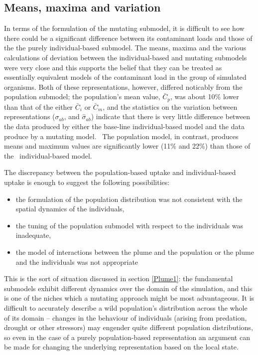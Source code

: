 \documentclass{article}
\newenvironment{itemizedot}{\begin{itemize} \renewcommand{\labelitemi}{$\bullet$}\renewcommand{\labelitemii}{$\bullet$}\renewcommand{\labelitemiii}{$\bullet$}\renewcommand{\labelitemiv}{$\bullet$}}{\end{itemize}}
\begin{document}
\subsection{Means, maxima and variation}

In terms of the formulation of the mutating submodel, it is difficult to see
how there could be a significant difference between its contaminant loads and
those of the the purely individual-based submodel. The means, maxima and the
various calculations of deviation between the individual-based and mutating
submodels were very close and this supports the belief that they can be
treated as essentially equivalent models of the contaminant load in the group
of simulated organisms. Both of these representations, however, differed
noticably from the population submodel; the population's mean value,
$\bar{C}_p$, was about 10\% lower than that of the either $\bar{C}_i$ or
$\bar{C}_m$, and the statistics on the variation between representations
($\sigma_{a b}$, and $\hat{\sigma}_{a b}$) indicate that there is very little
difference between the data produced by either the base-line individual-based
model and the data produce by a mutating model. \ The population model, in
contrast, produces means and maximum values are significantly lower (11\% and
22\%) than those of the \ individual-based model.

The discrepancy between the population-based uptake and individual-based
uptake is enough to suggest the following possibilities:
\begin{itemizedot}
  \item the formulation of the population distribution was not consistent with
  the spatial dynamics of the individuals,
  
  \item the tuning of the population submodel with respect to the individuals
  was inadequate,
  
  \item the model of interactions between the plume and the population or the
  plume and the individuals was not appropriate
\end{itemizedot}
This is the sort of situation discussed in section \ref{Plume1}: the
fundamental submodels exhibit different dynamics over the domain of the
simulation, and this is one of the niches which a mutating approach might be
most advantageous. It is difficult to accurately describe a wild population's
distribution across the whole of its domain -- changes in the behaviour of
individuals (arising from predation, drought or other stressors) may engender
quite different population distributions, so even in the case of a purely
population-based representation an argument can be made for changing the
underlying representation based on the local state.
\end{document}
